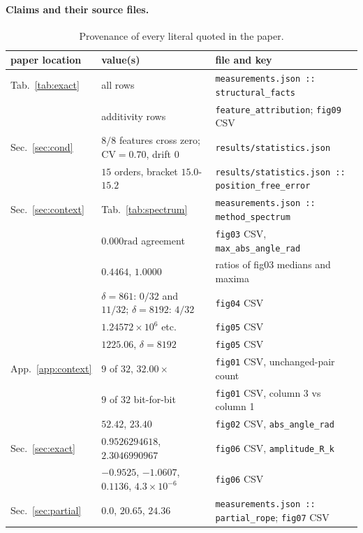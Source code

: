 \documentclass{article}
\theoremstyle{plain}
\theoremstyle{remark}
\newcommand{\rad}{\mathrm{rad}}
\begin{document}
\paragraph{Claims and their source files.}
\begin{table}[t]
\centering
\caption{Provenance of every literal quoted in the paper.}
\label{tab:provenance}
\scriptsize
\setlength{\tabcolsep}{1.9pt}
\begin{tabular}{lll}
\toprule
paper location & value(s) & file and key \\
\midrule
Tab.~\ref{tab:exact} & all rows & \texttt{measurements.json :: structural\_facts} \\
 & additivity rows & \texttt{feature\_attribution}; \texttt{fig09} CSV \\
Sec.~\ref{sec:cond} & $8/8$ features cross zero; $\mathrm{CV}=0.70$, drift $0$ & \texttt{results/statistics.json} \\
  & $15$ orders, bracket $15.0$-$15.2$ & \texttt{results/statistics.json :: position\_free\_error} \\
Sec.~\ref{sec:context} & Tab.~\ref{tab:spectrum} & \texttt{measurements.json :: method\_spectrum} \\
 & $0.000\rad$ agreement & \texttt{fig03} CSV, \texttt{max\_abs\_angle\_rad} \\
 & $0.4464$, $1.0000$ & ratios of fig03 medians and maxima \\
 & $\delta = 861$: $0/32$ and $11/32$; $\delta = 8192$: $4/32$ & \texttt{fig04} CSV \\
 & $1.24572\!\times\!10^{6}$ etc. & \texttt{fig05} CSV \\
 & $1225.06$, $\delta = 8192$ & \texttt{fig05} CSV \\
App.~\ref{app:context} & $9$ of $32$, $32.00\times$ & \texttt{fig01} CSV, unchanged-pair count \\
 & $9$ of $32$ bit-for-bit & \texttt{fig01} CSV, column 3 vs column 1 \\
 & $52.42$, $23.40$ & \texttt{fig02} CSV, \texttt{abs\_angle\_rad} \\
Sec.~\ref{sec:exact} & $0.9526294618$, $2.3046990967$ & \texttt{fig06} CSV, \texttt{amplitude\_R\_k} \\
 & $-0.9525$, $-1.0607$, $0.1136$, $4.3\!\times\!10^{-6}$ & \texttt{fig06} CSV \\
Sec.~\ref{sec:partial} & $0.0$, $20.65$, $24.36$ & \texttt{measurements.json :: partial\_rope}; \texttt{fig07} CSV \\

\end{tabular}
\end{table}
\end{document}
